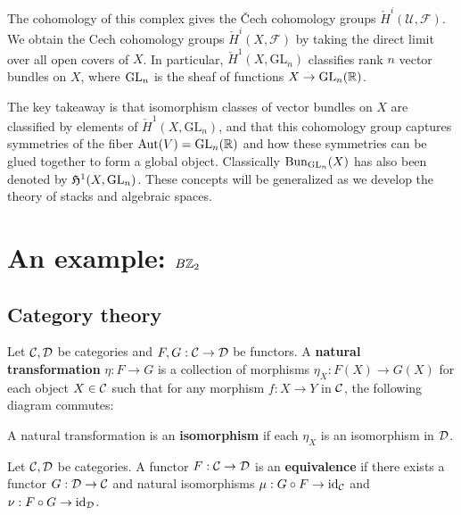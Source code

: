 \documentclass[12pt]{article}
\begin{document}
The cohomology of this complex gives the Čech cohomology groups $\check{H}^i(\mathcal{U}, \mathcal{F})$. We obtain the Cech cohomology groups $\check{H}^i(X, \mathcal{F})$ by taking the direct limit over all open covers of $X$. In particular, $\check{H}^1(X, \text{GL}_n)$ classifies rank $n$ vector bundles on $X$, where $\operatorname{GL}_n$ is the sheaf of functions $X \to \operatorname{GL}_n(\mathbb{R})$.

The key takeaway is that isomorphism classes of vector bundles on $X$ are classified by elements of $\check{H}^1(X, \text{GL}_n)$, and that this cohomology group captures symmetries of the fiber $\operatorname{Aut}(V) = \operatorname{GL}_n(\mathbb{R})$ and how these symmetries can be glued together to form a global object. Classically $\operatorname{Bun}_{\operatorname{GL}_n}(X)$ has also been denoted by $\mathfrak{H}^1(X, \operatorname{GL}_n)$. These concepts will be generalized as we develop the theory of stacks and algebraic spaces.

\section{An example: $B\mathbb{Z}_2$}
\subsection{Category theory}
\begin{definition}
    Let $\cal C, \cal D$ be categories and $F,G: \cal C \to \cal D$ be functors. A \textbf{natural transformation} $\eta: F \to G$ is a collection of morphisms $\eta_X: F(X) \to G(X)$ for each object $X \in \cal C$ such that for any morphism $f: X \to Y$ in $\cal C$, the following diagram commutes:
    \begin{center}
    \end{center}
    A natural transformation is an \textbf{isomorphism} if each $\eta_X$ is an isomorphism in $\cal D$.
\end{definition}

\begin{definition}
    Let $\cal C, \cal D$ be categories. A functor $F: \cal C \to \cal D$ is an \textbf{equivalence} if there exists a functor $G: \cal D \to \cal C$ and natural isomorphisms $\mu: G \circ F \to \text{id}_{\cal C}$ and $\nu: F \circ G \to \text{id}_{\cal D}$.
\end{definition}
\end{document}
